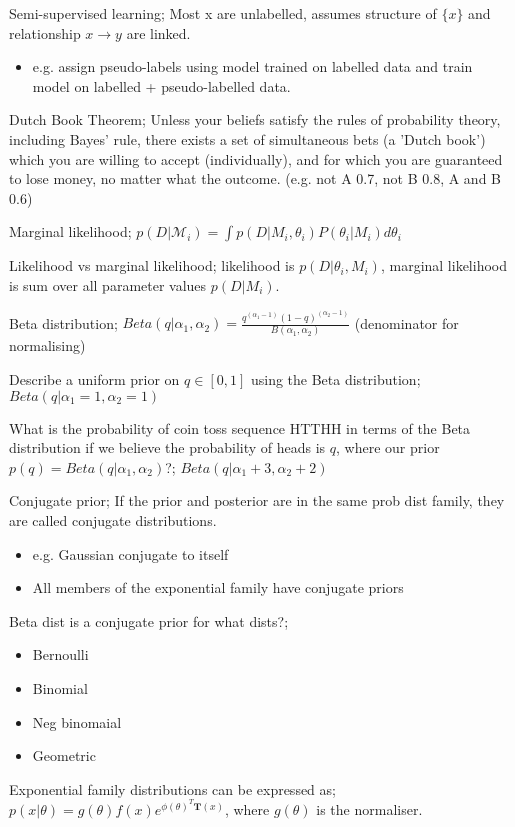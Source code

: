 \documentclass{article}
\begin{document}
Semi-supervised learning; Most x are unlabelled, assumes structure of $\{x\}$ and relationship $x\to y$ are linked. \begin{itemize} \item e.g. assign pseudo-labels using model trained on labelled data and train model on labelled + pseudo-labelled data.  \end{itemize}
	
Dutch Book Theorem; Unless your beliefs satisfy the rules of probability theory, including Bayes' rule, there exists a set of simultaneous bets (a 'Dutch book') which you are willing to accept (individually), and for which you are guaranteed to lose money, no matter what the outcome. (e.g. not A 0.7, not B 0.8, A and B 0.6)

Marginal likelihood; $p(D|\mathcal{M}_i)=\int p(D|M_i, \theta_i)P(\theta_i|M_i)d\theta_i$

Likelihood vs marginal likelihood; likelihood is $p(D|\theta_i, M_i)$, marginal likelihood is sum over all parameter values $p(D|M_i)$.

Beta distribution; $Beta(q|\alpha_1, \alpha_2) = \frac{q^{(\alpha_1 - 1)}(1-q)^{(\alpha_2-1)}}{B(\alpha_1,\alpha_2)}$ (denominator for normalising)

Describe a uniform prior on $q\in[0,1]$ using the Beta distribution; $Beta(q|\alpha_1=1,\alpha_2=1)$


What is the probability of coin toss sequence HTTHH in terms of the Beta distribution if we believe the probability of heads is $q$, where our prior $p(q) = Beta(q|\alpha_1, \alpha_2)$?; $Beta(q|\alpha_1 + 3, \alpha_2 + 2)$

Conjugate prior; If the prior and posterior are in the same prob dist family, they are called conjugate distributions. \begin{itemize} \item e.g. Gaussian conjugate to itself \item All members of the exponential family have conjugate priors \end{itemize}

Beta dist is a conjugate prior for what dists?; \begin{itemize} \item Bernoulli \item Binomial \item Neg binomaial \item Geometric \end{itemize}

Exponential family distributions can be expressed as; $p(x|\theta) = g(\theta)f(x)e^{\phi(\theta)^T\mathbf{T}(x)}$, where $g(\theta)$ is the normaliser.
\end{document}
